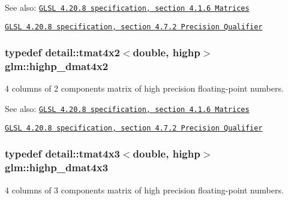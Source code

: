 \begin{Desc}
\item[See also:]\href{http://www.opengl.org/registry/doc/GLSLangSpec.4.20.8.pdf}{\tt GLSL 4.20.8 specification, section 4.1.6 Matrices} 

\href{http://www.opengl.org/registry/doc/GLSLangSpec.4.20.8.pdf}{\tt GLSL 4.20.8 specification, section 4.7.2 Precision Qualifier} \end{Desc}
\hypertarget{group__core__precision_ga4fb1ed350a6cd053abb9b093d13ce0d}{
\subsubsection[highp\_\-dmat4x2]{\setlength{\rightskip}{0pt plus 5cm}typedef detail::tmat4x2$<$double, highp$>$ {\bf glm::highp\_\-dmat4x2}}}
\label{group__core__precision_ga4fb1ed350a6cd053abb9b093d13ce0d}


4 columns of 2 components matrix of high precision floating-point numbers.

\begin{Desc}
\item[See also:]\href{http://www.opengl.org/registry/doc/GLSLangSpec.4.20.8.pdf}{\tt GLSL 4.20.8 specification, section 4.1.6 Matrices} 

\href{http://www.opengl.org/registry/doc/GLSLangSpec.4.20.8.pdf}{\tt GLSL 4.20.8 specification, section 4.7.2 Precision Qualifier} \end{Desc}
\hypertarget{group__core__precision_gf8aeba0eecc5c651e0f06414b6e37754}{
\subsubsection[highp\_\-dmat4x3]{\setlength{\rightskip}{0pt plus 5cm}typedef detail::tmat4x3$<$double, highp$>$ {\bf glm::highp\_\-dmat4x3}}}
\label{group__core__precision_gf8aeba0eecc5c651e0f06414b6e37754}


4 columns of 3 components matrix of high precision floating-point numbers.

